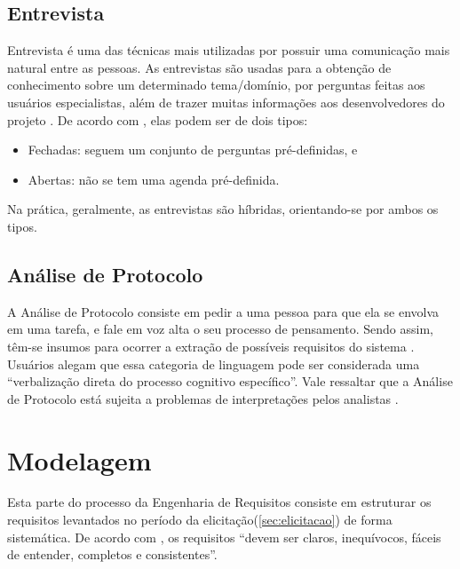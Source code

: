 \subsection{Entrevista}

\label{sec:entrevista}

Entrevista é uma das técnicas mais utilizadas por possuir uma comunicação mais natural entre as pessoas. As entrevistas são usadas para a obtenção de conhecimento sobre um determinado tema/domínio, por perguntas feitas aos usuários especialistas, além de trazer muitas informações aos desenvolvedores do projeto \cite{batista2003taxonomia}. De acordo com \cite{Sommerville10}, elas podem ser de dois tipos:
\begin{itemize}
    \item Fechadas: seguem um conjunto de perguntas pré-definidas, e
    \item Abertas: não se tem uma agenda pré-definida.
\end{itemize}
Na prática, geralmente, as entrevistas são híbridas, orientando-se por ambos os tipos.

\subsection{Análise de Protocolo}

\label{sec:analise-protocolo}

A Análise de Protocolo consiste em pedir a uma pessoa para que ela se envolva em uma tarefa, e fale em voz alta o seu processo de pensamento. Sendo assim, têm-se insumos para ocorrer a extração de possíveis requisitos do sistema \cite{goguen1993techniques}. Usuários alegam que essa categoria de linguagem pode ser considerada uma “verbalização direta do processo cognitivo específico”. Vale ressaltar que a Análise de Protocolo está sujeita a problemas de interpretações pelos analistas \cite{belgamo2000estudo}.

\section {Modelagem}

\label{sec:modelagem}

Esta parte do processo da Engenharia de Requisitos consiste em estruturar os requisitos levantados no período da elicitação(\ref{sec:elicitacao}) de forma sistemática. De acordo com \cite{Sommerville10}, os requisitos “devem ser claros, inequívocos, fáceis de entender, completos e consistentes”.

